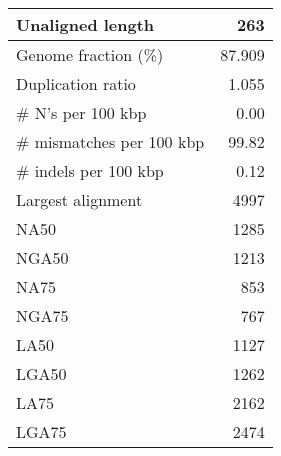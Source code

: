 \documentclass[12pt,a4paper]{article}
\begin{document}
\begin{table}[ht]
\begin{center}
\begin{tabular}{|l*{1}{|r}|}
Unaligned length & 263 \\ \hline
Genome fraction (\%) & 87.909 \\ \hline
Duplication ratio & 1.055 \\ \hline
\# N's per 100 kbp & 0.00 \\ \hline
\# mismatches per 100 kbp & 99.82 \\ \hline
\# indels per 100 kbp & 0.12 \\ \hline
Largest alignment & 4997 \\ \hline
NA50 & 1285 \\ \hline
NGA50 & 1213 \\ \hline
NA75 & 853 \\ \hline
NGA75 & 767 \\ \hline
LA50 & 1127 \\ \hline
LGA50 & 1262 \\ \hline
LA75 & 2162 \\ \hline
LGA75 & 2474 \\ \hline
\end{tabular}
\end{center}
\end{table}
\end{document}
